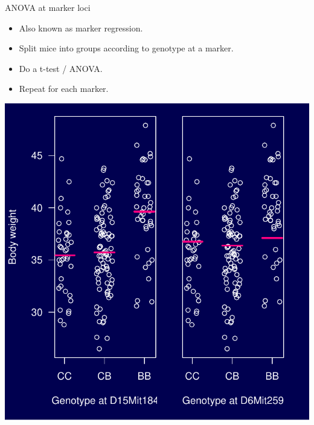\documentclass[12pt]{article}
\newcommand{\headsize}{\fontsize{35}{35} \selectfont}
\newcommand{\smallsize}{\fontsize{25}{30} \selectfont}
\newcommand{\smallersize}{\fontsize{20}{25} \selectfont}
\begin{document}
\newpage

\headsize \color{myyellow}
\hfill\begin{minipage}{5.75in}
\centering
ANOVA at marker loci
\end{minipage}

\vspace{2cm}

\color{mywhite} \smallsize

\hspace*{0.5in}
\begin{minipage}[t]{4.1in}
\vspace*{5mm}

\sloppy
\smallersize
\begin{itemize}
\setlength{\rightskip}{0pt plus 1fil} %
\item Also known as {\color{mypink} marker regression}.
\item Split mice into groups according to genotype at a marker.
\item Do a t-test / ANOVA.
\item Repeat for each marker.
\end{itemize}
\end{minipage}
\hfill
\begin{minipage}[t]{5.3in}
\vspace*{0mm}

\includegraphics{FigsA/anova.pdf}
\end{minipage}
\end{document}

